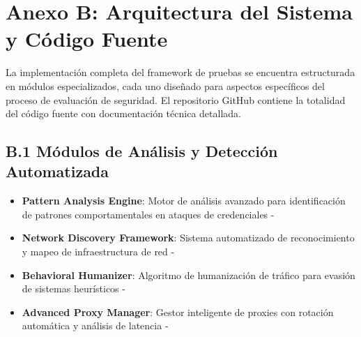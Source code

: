 \section*{Anexo B: Arquitectura del Sistema y Código Fuente}

La implementación completa del framework de pruebas se encuentra estructurada en módulos especializados, cada uno diseñado para aspectos específicos del proceso de evaluación de seguridad. El repositorio GitHub contiene la totalidad del código fuente con documentación técnica detallada.

\subsection*{B.1 Módulos de Análisis y Detección Automatizada}
\begin{itemize}
    \item \textbf{Pattern Analysis Engine}: Motor de análisis avanzado para identificación de patrones comportamentales en ataques de credenciales - 
    \item \textbf{Network Discovery Framework}: Sistema automatizado de reconocimiento y mapeo de infraestructura de red - 
    \item \textbf{Behavioral Humanizer}: Algoritmo de humanización de tráfico para evasión de sistemas heurísticos - 
    \item \textbf{Advanced Proxy Manager}: Gestor inteligente de proxies con rotación automática y análisis de latencia - 
\end{itemize}

